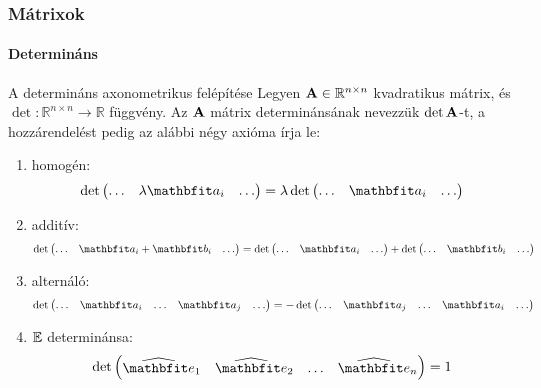 \begin{frame}
  \frametitle{Mátrixok}
  \framesubtitle{Determináns}

  \begin{block}{A determináns axonometrikus felépítése}
    Legyen $\mathbf{A} \in \mathbb R^{n \times n}$ kvadratikus mátrix, és
    $\det: \mathbb R^{n \times n} \rightarrow \mathbb R$ függvény.
    Az $\mathbf{A}$ mátrix determinánsának nevezzük $\det \mathbf{A}$-t,
    a hozzárendelést pedig az alábbi négy axióma írja le:
    \newcommand\noskp{\vspace{-3mm}}
    \begin{enumerate}
      \item homogén:\noskp
            \[
              \edet{\lambda \rvec a_i} = \lambda \edet{\rvec a_i}
            \]
      \item \noskp additív:\noskp
            \[
              \edet{\rvec a_i + \rvec b_i} =
              \edet{\rvec a_i} + \edet{\rvec b_i}
            \]
      \item \noskp alternáló:\noskp
            \[
              \edet{\rvec a_i & \dots & \rvec a_j} =
              - \edet{\rvec a_j & \dots & \rvec a_i}
            \]
      \item \noskp ${\mathbb{E}}$ determinánsa:\noskp
            \[
              \det \begin{pmatrix}
                \uvec e_1 & \uvec e_2 & \dots & \uvec e_n
              \end{pmatrix} = 1
            \]
    \end{enumerate}
  \end{block}
\end{frame}

